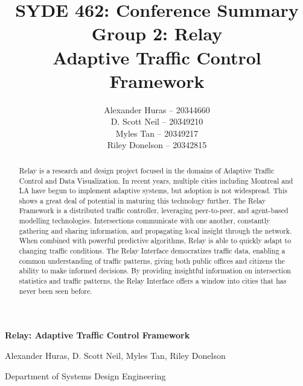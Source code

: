 \documentclass[a4paper,11pt]{article}
\author{  Alexander Huras -- 20344660\\
  D. Scott Neil -- 20349210\\
  Myles Tan -- 20349217\\
  Riley Donelson -- 20342815\\}
\title{SYDE 462: Conference Summary
\\Group 2: Relay \\
  Adaptive Traffic Control Framework}
\begin{document}
%

\centerline{  \bf \LARGE Relay: Adaptive Traffic Control Framework}
\centerline{Alexander Huras, D. Scott Neil, Myles Tan, Riley Donelson}
\centerline{Department of Systems Design Engineering}

\begin{abstract}
Relay is a research and design project focused in the domains of Adaptive Traffic Control and Data Visualization.
In recent years, multiple cities including Montreal and LA have begun to implement adaptive systems, but adoption is not widespread.
This shows a great deal of potential in maturing this technology further.
The Relay Framework is a distributed traffic controller, leveraging peer-to-peer, and agent-based modelling technologies.
Intersections communicate with one another, constantly gathering and sharing information, and propagating local insight through the network.
When combined with powerful predictive algorithms, Relay is able to quickly adapt to changing traffic conditions.
The Relay Interface democratizes traffic data, enabling a common understanding of traffic patterns, giving both public offices and citizens the ability to make informed decisions.
By providing insightful information on intersection statistics and traffic patterns, the Relay Interface offers a window into cities that has never been seen before.
\end{abstract}
\end{document}
